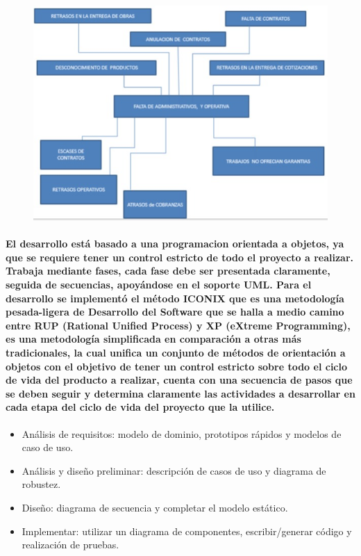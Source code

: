 \documentclass[12pt,a4paper]{article}
\begin{document}
\begin{figure}[hbtp]
\caption{}
\centering
\includegraphics[scale=0.3]{Primera.jpeg}
\end{figure}


\paragraph{
El desarrollo está basado a una programacion orientada a objetos, ya que se requiere tener un control estricto de todo el proyecto a realizar. Trabaja mediante fases, cada fase debe ser presentada claramente, seguida de secuencias, apoyándose en el soporte UML.
Para el desarrollo se implementó el método ICONIX que es una metodología pesada-ligera de Desarrollo del Software que se halla a medio camino entre RUP (Rational Unified Process) y XP (eXtreme Programming), es una metodología simplificada en comparación a otras más tradicionales, la cual unifica un conjunto de métodos de orientación a objetos con el objetivo de tener un control estricto sobre todo el ciclo de vida del producto a realizar, cuenta con una secuencia de pasos que se deben seguir y determina claramente las actividades a desarrollar en cada etapa del ciclo de vida del proyecto que la utilice.}
\newpage

\begin{itemize}
\item Análisis de requisitos: modelo de dominio, prototipos rápidos y modelos de caso de uso. 
\item Análisis y diseño preliminar: descripción de casos de uso y diagrama de robustez. 
\item Diseño: diagrama de secuencia y completar el modelo estático. 
\item Implementar: utilizar un diagrama de componentes, escribir/generar código y realización de pruebas. 
\end{itemize}
\end{document}
